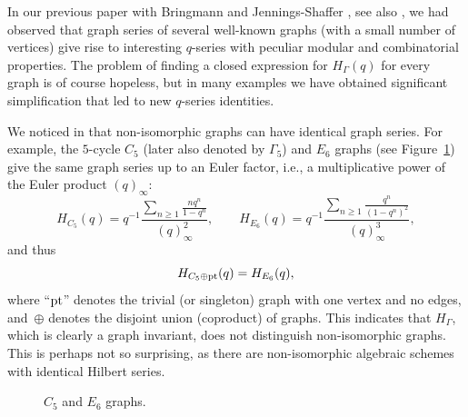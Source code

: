\documentclass[pdftex]{sigma}
\numberwithin{equation}{section}
\theoremstyle{definition}
\begin{document}
In our previous paper with Bringmann and Jennings-Shaffer \cite{BJM}, see also \cite{Hao,HM}, we had observed that graph series of several well-known graphs (with a small number of vertices) give rise to interesting $q$-series with peculiar modular and combinatorial properties. The problem of finding a closed expression for $H_\Gamma(q)$ for every graph is of course hopeless, but in many examples we have obtained significant simplification that led to new $q$-series identities.

We noticed in \cite{BJM} that non-isomorphic graphs can have identical graph series. For example, the $5$-cycle $C_5$ (later also denoted by $\Gamma_5$) and $E_6$
graphs (see Figure~\ref{Figure1})
give the same graph series up to an Euler factor, i.e., a multiplicative power of the Euler product $(q)_\infty$:
\begin{equation} \label{c5e6}
H_{C_5}(q)=q^{-1} \frac{\sum_{n \geq 1} \frac{n q^n}{1-q^n}}{(q)_\infty^2}, \qquad H_{E_6}(q)=q^{-1} \frac{\sum_{n \geq 1} \frac{q^n}{(1-q^n)^2}}{(q)_\infty^3},
\end{equation}
and thus
\begin{equation} \label{c5-e6}
H_{C_5 \oplus {\rm pt} }(q)=H_{E_6}(q),
\end{equation}
where ``${\rm pt}$'' denotes the trivial (or singleton) graph with one vertex and no edges, and~$\oplus$ denotes the disjoint union (coproduct) of graphs.
This indicates that $H_{\Gamma}$, which is clearly a graph invariant, does not distinguish non-isomorphic graphs. This is perhaps not so surprising, as there are non-isomorphic algebraic schemes with identical Hilbert series.

\begin{figure}[!ht]\centering
{}

\caption{$C_5$ and $E_6$ graphs.}\label{Figure1}
\end{figure}
\end{document}
